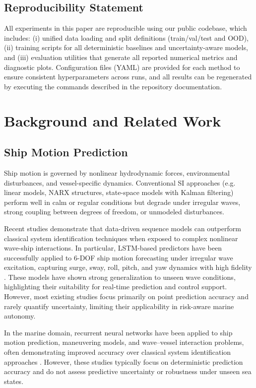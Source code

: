 \documentclass[a4paper,fleqn]{cas-sc}
\begin{document}
\subsection*{Reproducibility Statement}

All experiments in this paper are reproducible using our public codebase, which includes: (i) unified data loading and split definitions (train/val/test and OOD), (ii) training scripts for all deterministic baselines and uncertainty-aware models, and (iii) evaluation utilities that generate all reported numerical metrics and diagnostic plots. Configuration files (YAML) are provided for each method to ensure consistent hyperparameters across runs, and all results can be regenerated by executing the commands described in the repository documentation.
\section{Background and Related Work}

\subsection{Ship Motion Prediction}

Ship motion is governed by nonlinear hydrodynamic forces, environmental disturbances, and vessel-specific dynamics. Conventional SI approaches (e.g. linear models, NARX structures, state-space models with Kalman filtering) perform well in calm or regular conditions but degrade under irregular waves, strong coupling between degrees of freedom, or unmodeled disturbances.

Recent studies demonstrate that data-driven sequence models can outperform classical system identification techniques when exposed to complex nonlinear wave-ship interactions. In particular, LSTM-based predictors have been successfully applied to 6-DOF ship motion forecasting under irregular wave excitation, capturing surge, sway, roll, pitch, and yaw dynamics with high fidelity \cite{silva2022ship}. These models have shown strong generalization to unseen wave conditions, highlighting their suitability for real-time prediction and control support. However, most existing studies focus primarily on point prediction accuracy and rarely quantify uncertainty, limiting their applicability in risk-aware marine autonomy.

In the marine domain, recurrent neural networks have been applied to ship motion prediction, maneuvering models, and wave–vessel interaction problems, often demonstrating improved accuracy over classical system identification approaches \cite{silva2022ship,foldesi2023comparison}. However, these studies typically focus on deterministic prediction accuracy and do not assess predictive uncertainty or robustness under unseen sea states.
\end{document}
